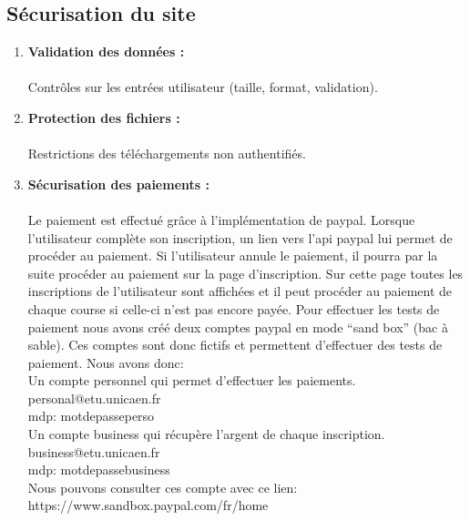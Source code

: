 \documentclass[12pt]{article} %
\begin{document}
		
		
	\subsection{Sécurisation du site}
        \begin{enumerate}
            \item \textbf{Validation des données :}\\ \\
                Contrôles sur les entrées utilisateur (taille, format, validation).
            \item \textbf{Protection des fichiers :}\\ \\
                Restrictions des téléchargements non authentifiés.
            \item \textbf{Sécurisation des paiements :}\\ \\
                Le paiement est effectué grâce à l'implémentation de paypal. Lorsque l'utilisateur complète son inscription, un lien vers l’api paypal lui permet de procéder au paiement. Si l'utilisateur annule le paiement, il pourra par la suite procéder au paiement sur la page d’inscription. Sur cette page toutes les inscriptions de l'utilisateur sont affichées et il peut procéder au paiement de chaque course si celle-ci n'est pas encore payée. Pour effectuer les tests de paiement nous avons créé deux comptes paypal en mode “sand box” (bac à sable). Ces comptes sont donc fictifs et permettent d'effectuer des tests de paiement. Nous avons donc:\\
                Un compte personnel qui permet d'effectuer les paiements.\\
                personal@etu.unicaen.fr\\
                mdp: motdepasseperso\\
                Un compte business qui récupère l’argent de chaque inscription.\\
                business@etu.unicaen.fr\\
                mdp: motdepassebusiness\\
                Nous pouvons consulter ces compte avec ce lien:\\  https://www.sandbox.paypal.com/fr/home\\

        \end{enumerate}
\end{document}
